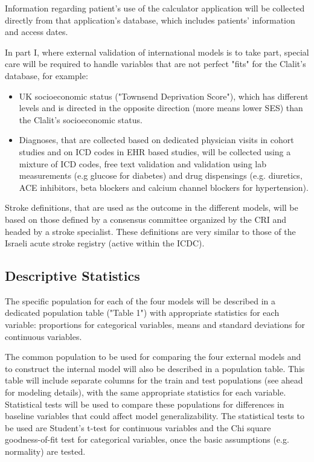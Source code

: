\documentclass[a4paper,12pt]{article}
\begin{document}
	Information regarding patient's use of the calculator application will be collected directly from that application's database, which includes patients' information and access dates.
	
	In part I, where external validation of international models is to take part, special care will be required to handle variables that are not perfect "fits" for the Clalit's database, for example:
	\begin{itemize}
		\item UK socioeconomic status ("Townsend Deprivation Score"), which has different levels and is directed in the opposite direction (more means lower SES) than the Clalit's socioeconomic status.
		\item Diagnoses, that are collected based on dedicated physician visits in cohort studies and on ICD codes in EHR based studies, will be collected using a mixture of ICD codes, free text validation and validation using lab measurements (e.g glucose for diabetes) and drug dispensings (e.g. diuretics, ACE inhibitors, beta blockers and calcium channel blockers for hypertension).
	\end{itemize}

	Stroke definitions, that are used as the outcome in the different models, will be based on those defined by a consensus committee organized by the CRI and headed by a stroke specialist. These definitions are very similar to those of the Israeli acute stroke registry\cite{ICDC2017} (active within the ICDC).
	
	\subsection{Descriptive Statistics}
	The specific population for each of the four models will be described in a dedicated population table ("Table 1") with appropriate statistics for each variable: proportions for categorical variables, means and standard deviations for continuous variables.
	
	The common population to be used for comparing the four external models and to construct the internal model will also be described in a population table. This table will include separate columns for the train and test populations (see ahead for modeling details), with the same appropriate statistics for each variable. Statistical tests will be used to compare these populations for differences in baseline variables that could affect model generalizability. The statistical tests to be used are Student's t-test for continuous variables and the Chi square goodness-of-fit test for categorical variables, once the basic assumptions (e.g. normality) are tested.
	
\end{document}
